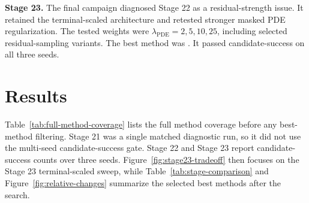 \documentclass[11pt]{article}
\begin{document}
\textbf{Stage 23.} The final campaign diagnosed Stage 22 as a residual-strength issue. It retained the terminal-scaled architecture and retested stronger masked PDE regularization. The tested weights were \(\lambda_{\mathrm{PDE}}=2,5,10,25\), including selected residual-sampling variants. The best method was . It passed candidate-success on all three seeds.

\section{Results}

Table~\ref{tab:full-method-coverage} lists the full method coverage before any best-method filtering. Stage 21 was a single matched diagnostic run, so it did not use the multi-seed candidate-success gate. Stage 22 and Stage 23 report candidate-success counts over three seeds. Figure~\ref{fig:stage23-tradeoff} then focuses on the Stage 23 terminal-scaled sweep, while Table~\ref{tab:stage-comparison} and Figure~\ref{fig:relative-changes} summarize the selected best methods after the search.
\end{document}
